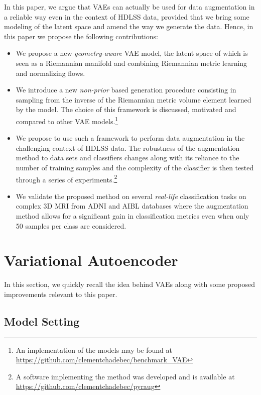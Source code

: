 \documentclass[10pt,journal,compsoc]{IEEEtran}
\begin{document}
In this paper, we argue that VAEs can actually be used for data augmentation in a reliable way even in the context of HDLSS data, provided that we bring some modeling of the latent space and amend the way we generate the data. Hence, in this paper we propose the following contributions:
\begin{itemize}
    \item We propose a new \emph{geometry-aware} VAE model, the latent space of which is seen as a Riemannian manifold and combining Riemannian metric learning and normalizing flows.
    \item We introduce a new \emph{non-prior} based generation procedure consisting in sampling from the inverse of the Riemannian metric volume element learned by the model. The choice of this framework is discussed, motivated and compared to other VAE models.\footnote{An implementation of the models may be found at \url{https://github.com/clementchadebec/benchmark_VAE} }
    \item We propose to use such a framework to perform data augmentation in the challenging context of HDLSS data. The robustness of the augmentation method to data sets and classifiers changes along with its reliance to the number of training samples and the complexity of the classifier is then tested through a series of experiments.\footnote{A software implementing the method was developed and is available at \url{https://github.com/clementchadebec/pyraug} }
    \item We validate the proposed method on several \emph{real-life} classification tasks on complex 3D MRI from ADNI and AIBL databases where the augmentation method allows for a significant gain in classification metrics even when only 50 samples per class are considered.
\end{itemize}



\section{Variational Autoencoder}

In this section, we quickly recall the idea behind VAEs along with some proposed improvements relevant to this paper.

\subsection{Model Setting}
\end{document}
